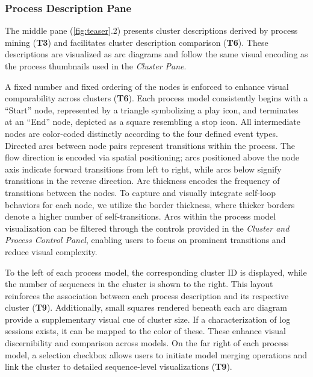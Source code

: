 \documentclass[preprint,journal]{vgtc}            %
\begin{document}
\subsubsection{Process Description Pane}
\label{subsubsec:process_description_pane}

The middle pane (\cref{fig:teaser}.2) presents cluster descriptions derived by process mining (\textbf{T3}) and facilitates cluster description comparison (\textbf{T6}). 
These descriptions are visualized as arc diagrams and follow the same visual encoding as the process thumbnails used in the \textit{Cluster Pane}.

A fixed number and fixed ordering of the nodes is enforced to enhance visual comparability across clusters (\textbf{T6}).
Each process model consistently begins with a ``Start'' node, represented by a triangle symbolizing a play icon, and terminates at an ``End'' node, depicted as a square resembling a stop icon.
All intermediate nodes are color-coded distinctly according to the four defined event types.
Directed arcs between node pairs represent transitions within the process.
The flow direction is encoded via spatial positioning; arcs positioned above the node axis indicate forward transitions from left to right, while arcs below signify transitions in the reverse direction.
Arc thickness encodes the frequency of transitions between the nodes. 
To capture and visually integrate self-loop behaviors for each node, we utilize the border thickness, where thicker borders denote a higher number of self-transitions.
Arcs within the process model visualization can be filtered through the controls provided in the \textit{Cluster and Process Control Panel}, enabling users to focus on prominent transitions and reduce visual complexity.

To the left of each process model, the corresponding cluster ID is displayed, while the number of sequences in the cluster is shown to the right. 
This layout reinforces the association between each process description and its respective cluster (\textbf{T9}).
Additionally, small squares rendered beneath each arc diagram provide a supplementary visual cue of cluster size. 
If a characterization of log sessions exists, it can be mapped to the color of these.
These enhance visual discernibility and comparison across models.
On the far right of each process model, a selection checkbox allows users to initiate model merging operations and link the cluster to detailed sequence-level visualizations (\textbf{T9}).
\end{document}
